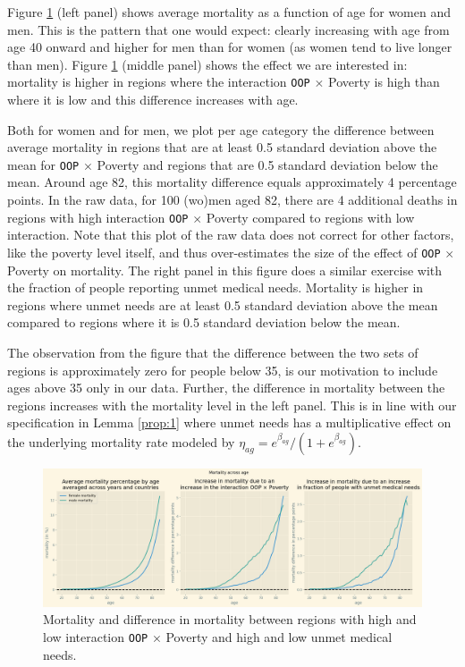 \documentclass[a4paper,12pt]{article}
\begin{document}
Figure \ref{fig:DifferenceMortalityData} (left panel) shows average mortality as a function of age for women and men. This is the pattern that one would expect: clearly increasing with age from age 40 onward and higher for men than for women (as women tend to live longer than men). Figure \ref{fig:DifferenceMortalityData} (middle panel) shows the effect we are interested in: mortality is higher in regions where the interaction \texttt{OOP} \(\times\) Poverty is high than where it is low and this difference increases with age. 

Both for women and for men, we plot per age category the difference between average mortality in regions that are at least 0.5 standard deviation above the mean for \texttt{OOP} \(\times\) Poverty and regions that are 0.5 standard deviation below the mean. Around age 82, this mortality difference equals approximately 4 percentage points. In the raw data, for 100 (wo)men aged 82, there are 4 additional deaths in regions with high interaction \texttt{OOP} \(\times\) Poverty compared to regions with low interaction. Note that this plot of the raw data does not correct for other factors, like the poverty level itself, and thus over-estimates the size of the effect of \texttt{OOP} \(\times\) Poverty on mortality. The right panel in this figure does a similar exercise with the fraction of people reporting unmet medical needs. Mortality is higher in regions where unmet needs are at least 0.5 standard deviation above the mean compared to regions where it is 0.5 standard deviation below the mean.

The observation from the figure that the difference between the two sets of regions is approximately zero for people below 35, is our motivation to include ages above 35 only in our data. Further, the difference in mortality between the regions increases with the mortality level in the left panel. This is in line with our specification in Lemma \ref{prop:1} where unmet needs has a multiplicative effect on the underlying mortality rate modeled by \(\eta_{ag} = e^{\beta_{ag}}/(1+e^{\beta_{ag}})\).


\begin{figure}[htbp]
\centering
\includegraphics[width=.9\linewidth]{./figures/IncreaseMortalityInteractionData.png}
\caption{\label{fig:DifferenceMortalityData}Mortality and difference in mortality between regions with high and low interaction \texttt{OOP} \(\times\) Poverty and high and low unmet medical needs.}
\end{figure}
\end{document}
